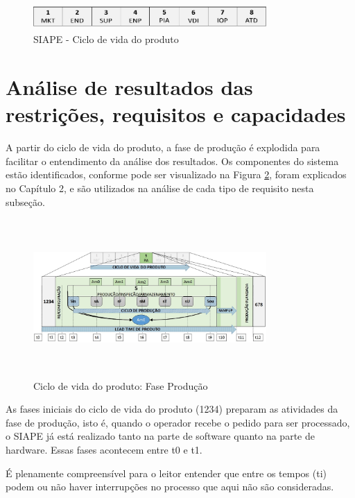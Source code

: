 \documentclass[10pt,letterpaper,twocolumn]{IEEEtran}
\begin{document}
\begin{figure}[h]
	\centering
	\includegraphics[width=8.9cm, height=1cm]{MeDSE_imagens/F118_CICLO_SIAPE.jpg} 
	\caption{SIAPE - Ciclo de vida do produto}
	\label{F118}
\end{figure}


					
					\section{Análise de resultados das  restrições, requisitos e capacidades}
					
					A partir do ciclo de vida do produto, a fase de produção é explodida para facilitar o entendimento da 
					análise dos resultados. Os componentes do sistema estão identificados, conforme pode ser visualizado 
					na Figura \ref{F120}, foram explicados no Capítulo 2, e são utilizados na análise de cada tipo de 
					requisito nesta subseção.  											
					
					
					\begin{figure}[h]
						\centering
						\includegraphics[width=8.9cm, height=6cm]{MeDSE_imagens/F120_SIAPE_CICLO_EXPLODIDO.jpg} 
						\caption{Ciclo de vida do produto: Fase Produção}
						\label{F120}
					\end{figure}
					
					As fases iniciais do ciclo de vida do produto (1234) preparam as atividades da fase de produção, isto é, quando o operador recebe o pedido para ser processado, o SIAPE já está realizado tanto na parte de software quanto na parte de hardware. Essas fases acontecem entre t0 e t1. \par 
					
					É plenamente compreensível para o leitor entender que entre os tempos (ti) podem ou não haver interrupções no processo que aqui não são consideradas.\par 
					
\end{document}
